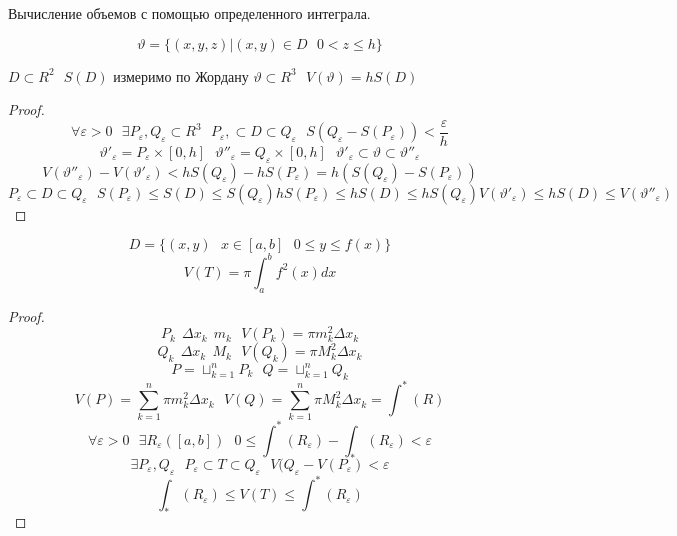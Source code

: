 \begin{title}[\Large]
  Вычисление объемов с помощью определенного интеграла.
\end{title}

\begin{defin}[цилиндра]
  $$
  \vartheta = \{ (x,y,z) | (x,y) \in D ~~~ 0 < z \le h\}
  $$
\end{defin}

\begin{theorem}
  $D \subset R^2 ~~~ S(D)$ измеримо по Жордану $\vartheta \subset R^3 ~~~
  V(\vartheta) = h S(D)$
\end{theorem}

\begin{proof}
  $$
  \forall \varepsilon > 0 ~~~
  \exists P_{\varepsilon}, Q_{\varepsilon} \subset R^3 ~~~
  P_{\varepsilon}, \subset D \subset Q_{\varepsilon} ~~~
  S(Q_{\varepsilon} - S(P_{\varepsilon})) < \frac{\varepsilon}{h}
  $$
  $$
  \vartheta'_{\varepsilon} = P_{\varepsilon} \times [0,h] ~~~
  \vartheta''_{\varepsilon} = Q_{\varepsilon} \times [0,h] ~~~
  \vartheta'_{\varepsilon} \subset \vartheta \subset \vartheta''_{\varepsilon}
  $$
  $$
  V(\vartheta''_{\varepsilon}) - V(\vartheta'_{\varepsilon}) <
  h S(Q_{\varepsilon}) - h S(P_{\varepsilon}) =
  h (S(Q_{\varepsilon}) - S(P_{\varepsilon}))
  $$
  $$
  P_{\varepsilon} \subset D \subset Q_{\varepsilon} ~~~
  S(P_{\varepsilon}) \le S(D) \le S(Q_{\varepsilon})
  hS(P_{\varepsilon}) \le hS(D) \le hS(Q_{\varepsilon})
  V(\vartheta'_{\varepsilon}) \le h S(D) \le V(\vartheta''_{\varepsilon})
  $$
\end{proof}

\begin{theorem}
  $$
  D = \{ (x,y) ~~~ x \in [a,b] ~~~
  0 \le y \le f(x) \}
  $$
  $$
  V(T) = \pi \int_a^b f^2(x) dx
  $$
\end{theorem}

\begin{proof}
  $$
  P_k ~~ \Delta x_k ~~ m_k ~~~
  V(P_k) = \pi m_k^2 \Delta x_k
  $$
  $$
  Q_k ~~ \Delta x_k ~~ M_k ~~~
  V(Q_k) = \pi M_k^2 \Delta x_k
  $$
  $$
  P = \sqcup_{k=1}^n P_k ~~~
  Q = \sqcup_{k=1}^n Q_k
  $$
  $$
  V(P) = \sum_{k=1}^n \pi m_k^2 \Delta x_k ~~~
  V(Q) = \sum_{k=1}^n \pi M_k^2 \Delta x_k = \int^* (R)
  $$
  $$
  \forall \varepsilon > 0 ~~~
  \exists R_{\varepsilon} ([a,b]) ~~~
  0 \le \int^* (R_{\varepsilon}) - \int_* (R_{\varepsilon}) < \varepsilon
  $$
  $$
  \exists P_{\varepsilon}, Q_{\varepsilon} ~~~
  P_{\varepsilon} \subset T \subset Q_{\varepsilon} ~~~
  V(Q_{\varepsilon} - V(P_{\varepsilon}) < \varepsilon
  $$
  $$
  \int_* (R_{\varepsilon}) \le V(T) \le \int^* (R_{\varepsilon})
  $$
\end{proof}

